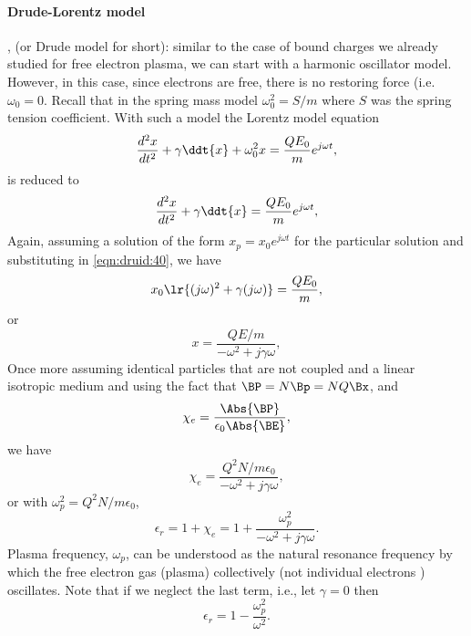 \paragraph{Drude-Lorentz model}, (or Drude model for short): similar to the case of bound charges we already studied for free electron plasma, we can start with a harmonic oscillator model.  However, in this case, since electrons are free, there is no restoring force (i.e. \(\omega_0 = 0 \).  Recall that in the spring mass model \( \omega_0^2 = S/m \) where \( S \) was the spring tension coefficient.
%
With such a model the Lorentz model equation
%
\begin{dmath}\label{eqn:druid:20}
\frac{d^2 x}{dt^2} + \gamma \ddt{x} + \omega_0^2 x = \frac{Q E_0}{m} e^{j \omega t},
\end{dmath}
%
is reduced to
%
\begin{dmath}\label{eqn:druid:40}
\frac{d^2 x}{dt^2} + \gamma \ddt{x} = \frac{Q E_0}{m} e^{j \omega t},
\end{dmath}
%
Again, assuming a solution of the form \( x_p = x_0 e^{j \omega t} \) for the particular solution and substituting in \cref{eqn:druid:40}, we have
%
\begin{dmath}\label{eqn:druid:80}
x_0 \lr{ (j\omega)^2 + \gamma (j \omega)} = \frac{Q E_0}{m},
\end{dmath}
%
or
\begin{dmath}\label{eqn:druid:60}
x
=
\frac{Q E/m}{-\omega^2 + j \gamma \omega },
\end{dmath}
%
Once more assuming identical particles that are not coupled and a linear isotropic medium and using the fact that \( \BP = N \Bp = N Q \Bx \), and
%
\begin{dmath}\label{eqn:druid:100}
\chi_e = \frac{\Abs{\BP}}{\epsilon_0 \Abs{\BE} },
\end{dmath}
%
we have
%
\begin{dmath}\label{eqn:druid:120}
\chi_e
=
\frac{Q^2 N/m \epsilon_0}{-\omega^2 + j \gamma \omega },
\end{dmath}
%
or with \( \omega_p^2 = Q^2 N/m\epsilon_0\),
%
\begin{dmath}\label{eqn:druid:140}
\epsilon_r
= 1 + \chi_e
=
1+
\frac{\omega_p^2}{-\omega^2 + j \gamma \omega }.
\end{dmath}
%
Plasma frequency, \( \omega_p \), can be understood as the natural resonance frequency by which the free electron gas (plasma) collectively (not individual electrons ) oscillates.
%
Note that if we neglect the last term, i.e., let \( \gamma = 0 \) then
%
\begin{dmath}\label{eqn:druid:160}
\epsilon_r = 1 - \frac{\omega_p^2}{\omega^2}.
\end{dmath}
